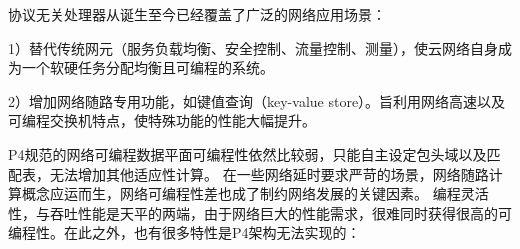 %
%
%
%
%




\label{chap233}
协议无关处理器从诞生至今已经覆盖了广泛的网络应用场景：

1）替代传统网元（服务负载均衡、安全控制、流量控制、测量），使云网络自身成为一个软硬任务分配均衡且可编程的系统。

2）增加网络随路专用功能，如键值查询（key-value store）。旨利用网络高速以及可编程交换机特点，使特殊功能的性能大幅提升。

P4规范的网络可编程数据平面可编程性依然比较弱，只能自主设定包头域以及匹配表，无法增加其他适应性计算。
在一些网络延时要求严苛的场景，网络随路计算概念应运而生，网络可编程性差也成了制约网络发展的关键因素。
编程灵活性，与吞吐性能是天平的两端，由于网络巨大的性能需求，很难同时获得很高的可编程性。在此之外，也有很多特性是P4架构无法实现的：

